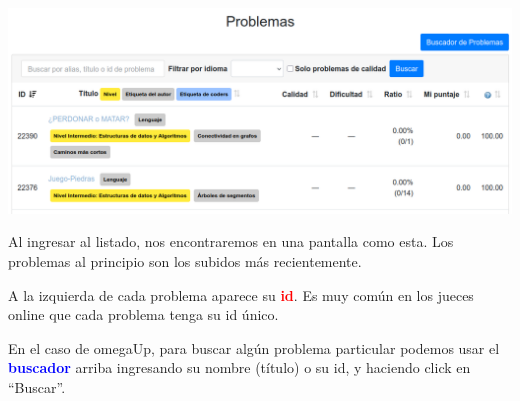 \documentclass{beamer}
\begin{document}
    \begin{frame}[noframenumbering]
        \begin{center}
            \includegraphics[width=.8\linewidth]{./ou_problems.png}
        \end{center} \pause
        

        Al ingresar al listado, nos encontraremos en una pantalla como esta. Los problemas al principio son los subidos más recientemente. \pause

        A la izquierda de cada problema aparece su \textbf{\textcolor{red}{id}}. Es muy común en los jueces online que cada problema tenga su id único. \pause

        En el caso de omegaUp, para buscar algún problema particular podemos usar el \textcolor{blue}{\textbf{buscador}} arriba ingresando su nombre (título) o su id, y haciendo click en ``Buscar''.
    \end{frame}
\end{document}
